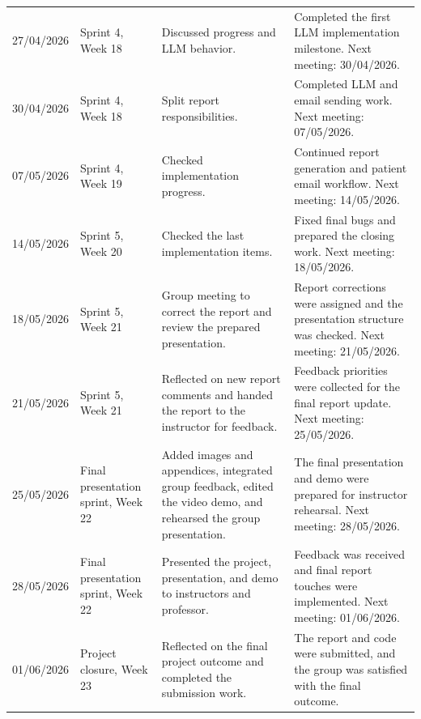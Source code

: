 \begin{longtable}{@{}P{0.13\textwidth}P{0.19\textwidth}P{0.31\textwidth}P{0.29\textwidth}@{}}
27/04/2026 & Sprint 4, Week 18 & Discussed progress and LLM behavior. & Completed the first LLM implementation milestone. Next meeting: 30/04/2026. \\
30/04/2026 & Sprint 4, Week 18 & Split report responsibilities. & Completed LLM and email sending work. Next meeting: 07/05/2026. \\
07/05/2026 & Sprint 4, Week 19 & Checked implementation progress. & Continued report generation and patient email workflow. Next meeting: 14/05/2026. \\
14/05/2026 & Sprint 5, Week 20 & Checked the last implementation items. & Fixed final bugs and prepared the closing work. Next meeting: 18/05/2026. \\
18/05/2026 & Sprint 5, Week 21 & Group meeting to correct the report and review the prepared presentation. & Report corrections were assigned and the presentation structure was checked. Next meeting: 21/05/2026. \\
21/05/2026 & Sprint 5, Week 21 & Reflected on new report comments and handed the report to the instructor for feedback. & Feedback priorities were collected for the final report update. Next meeting: 25/05/2026. \\
25/05/2026 & Final presentation sprint, Week 22 & Added images and appendices, integrated group feedback, edited the video demo, and rehearsed the group presentation. & The final presentation and demo were prepared for instructor rehearsal. Next meeting: 28/05/2026. \\
28/05/2026 & Final presentation sprint, Week 22 & Presented the project, presentation, and demo to instructors and professor. & Feedback was received and final report touches were implemented. Next meeting: 01/06/2026. \\
01/06/2026 & Project closure, Week 23 & Reflected on the final project outcome and completed the submission work. & The report and code were submitted, and the group was satisfied with the final outcome. \\
\end{longtable}
\endgroup
